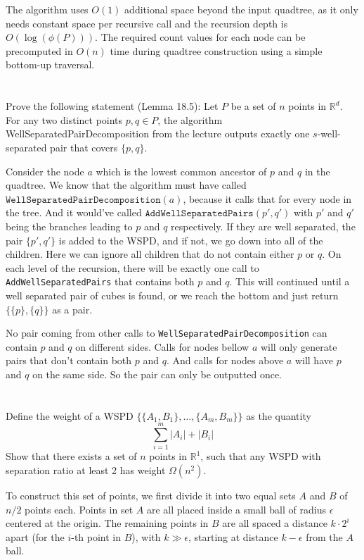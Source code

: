 \documentclass{article}
\newcommand{\R}{\mathbb{R}}
\begin{document}
The algorithm uses $O(1)$ additional space beyond the input quadtree, as it only needs constant space per recursive call and the recursion depth is $O(\log(\phi(P)))$. The required count values for each node can be precomputed in $O(n)$ time during quadtree construction using a simple bottom-up traversal.

  \section{}
  \begin{centerframebox}
    Prove the following statement (Lemma 18.5): Let $P$ be a set of $n$ points in $\R^d$. For any two
    distinct points $p, q \in P$, the algorithm WellSeparatedPairDecomposition from the lecture
    outputs exactly one $s$-well-separated pair that covers $\{p, q\}$.
  \end{centerframebox}
  Consider the node $a$ which is the lowest common ancestor of $p$ and $q$ in the quadtree.
  We know that the algorithm must have called $\texttt{WellSeparatedPairDecomposition}(a)$, because it calls that for every node in the tree.
  And it would've called $\texttt{AddWellSeparatedPairs}(p', q')$ with $p'$ and $q'$ being the branches leading to $p$ and $q$ respectively.
  If they are well separated, the pair $\{p', q'\}$ is added to the WSPD, and if not, we go down into all of the children.
  Here we can ignore all children that do not contain either $p$ or $q$.
  On each level of the recursion, there will be exactly one call to \texttt{AddWellSeparatedPairs} that contains both $p$ and $q$.
  This will continued until a well separated pair of cubes is found, or we reach the bottom and just return $\{\{p\}, \{q\}\}$ as a pair.

  No pair coming from other calls to \texttt{WellSeparatedPairDecomposition} can contain $p$ and $q$ on different sides.
  Calls for nodes bellow $a$ will only generate pairs that don't contain both $p$ and $q$.
  And calls for nodes above $a$ will have $p$ and $q$ on the same side.
  So the pair can only be outputted once.

  \section{}
  \begin{centerframebox}
    Define the weight of a WSPD \(\{ \{A_1, B_1\}, \ldots, \{A_m, B_m\} \}\) as the quantity
    \[ \sum_{i=1}^m |A_i| + |B_i| \]
    Show that there exists a set of \(n\) points in \(\R^1\), such that any WSPD with separation ratio at least 2 has weight \(\Omega(n^2)\).
  \end{centerframebox}
  To construct this set of points, we first divide it into two equal sets $A$ and $B$ of $n/2$ points each.
  Points in set $A$ are all placed inside a small ball of radius $\epsilon$ centered at the origin.
  The remaining points in $B$ are all spaced a distance $k \cdot 2^i$ apart (for the $i$-th point in $B$), with $k \gg \epsilon$, starting at distance $k-\epsilon$ from the $A$ ball.
\end{document}
